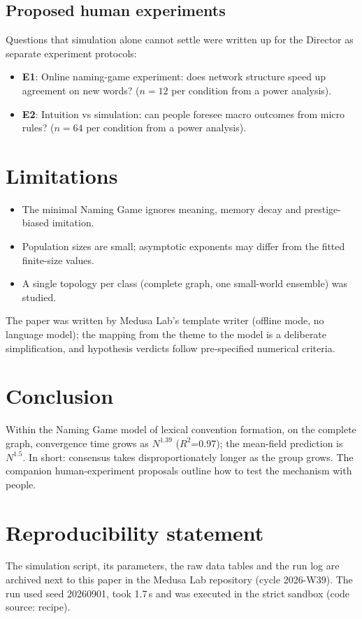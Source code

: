 \documentclass[11pt,a4paper]{article}
\begin{document}
\subsection*{Proposed human experiments}
Questions that simulation alone cannot settle were written up for the Director as separate experiment protocols:
\begin{itemize}
  \item \textbf{E1}: Online naming-game experiment: does network structure speed up agreement on new words? ($n = 12$ per condition from a power analysis).
  \item \textbf{E2}: Intuition vs simulation: can people foresee macro outcomes from micro rules? ($n = 64$ per condition from a power analysis).
\end{itemize}
\section{Limitations}
\begin{itemize}
  \item The minimal Naming Game ignores meaning, memory decay and prestige-biased imitation.
  \item Population sizes are small; asymptotic exponents may differ from the fitted finite-size values.
  \item A single topology per class (complete graph, one small-world ensemble) was studied.
\end{itemize}

The paper was written by Medusa Lab's template writer (offline mode, no language model); the mapping from the theme to the model is a deliberate simplification, and hypothesis verdicts follow pre-specified numerical criteria.

\section{Conclusion}
Within the Naming Game model of lexical convention formation, on the complete graph, convergence time grows as $N^{1.39}$ ($R^{2}$=0.97); the mean-field prediction is $N^{1.5}$. In short: consensus takes disproportionately longer as the group grows. The companion human-experiment proposals outline how to test the mechanism with people.

\section*{Reproducibility statement}
The simulation script, its parameters, the raw data tables and the run log are archived next to this paper in the
Medusa Lab repository (cycle 2026-W39). The run used seed 20260901, took 1.7\,s and was
executed in the strict sandbox (code source: recipe).
\end{document}
